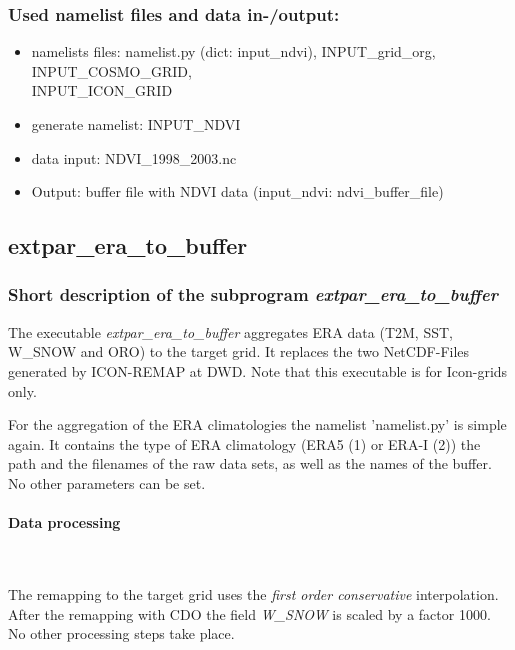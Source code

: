 \documentclass[a4paper,10pt,DIV14,BCOR1cm,titlepage,twoside]{scrartcl}
\begin{document}
\subsubsection{Used namelist files and data in-/output:}
\begin{itemize}
 \item namelists files: namelist.py (dict: input\_ndvi), INPUT\_grid\_org, INPUT\_COSMO\_GRID, \\
       INPUT\_ICON\_GRID
 \item generate namelist: INPUT\_NDVI
 \item data input: NDVI\_1998\_2003.nc
 \item Output: buffer file with NDVI data (input\_ndvi: ndvi\_buffer\_file)
\end{itemize}

\subsection{extpar\_era\_to\_buffer}\label{extpar_era_to_buffer}
\subsubsection{Short description of the subprogram \textit{extpar\_era\_to\_buffer}}
The executable \textit{extpar\_era\_to\_buffer} aggregates ERA data (T2M, SST, W\_SNOW and ORO) to the target grid. It replaces the two NetCDF-Files generated by ICON-REMAP at DWD. Note that this executable is for Icon-grids only.\par\medskip\noindent
For the aggregation of the ERA climatologies the namelist 'namelist.py' is simple again. It contains the type of ERA climatology (ERA5 (1) or ERA-I (2)) the path and the filenames of the raw data sets, as well as the names of the buffer. No other parameters can be set. \par\medskip\noindent
\paragraph{Data processing} \ \par\medskip\noindent
The remapping to the target grid uses the \textit{first order conservative} interpolation. After the remapping with CDO the field \textit{W\_SNOW} is scaled by a factor 1000. No other processing steps take place. 
\end{document}

